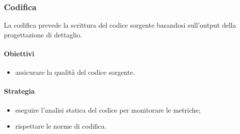     \subsubsection{Codifica}
        La codifica prevede la scrittura del codice sorgente basandosi sull'output della progettazione di dettaglio.
        \paragraph{Obiettivi}
            \begin{itemize}
                \item assicurare la qualità del codice sorgente.
            \end{itemize}
        \paragraph{Strategia}
            \begin{itemize}
                \item eseguire l'analisi statica del codice per monitorare le metriche;
                \item rispettare le norme di codifica.
            \end{itemize}

